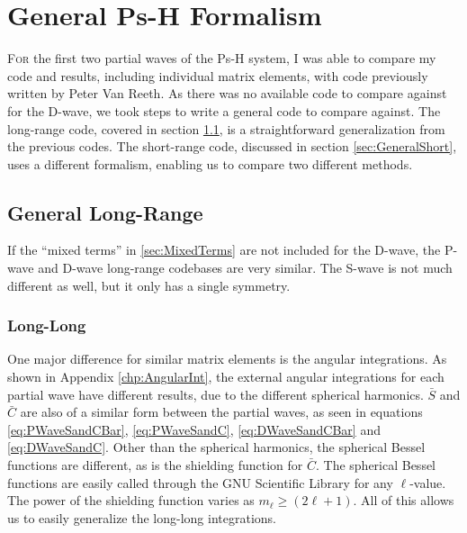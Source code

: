 \documentclass[Dissertation.tex]{subfiles}
\begin{document}
\clearpage
\pagebreak
\newpage

\chapter{General Ps-H Formalism}
\label{chp:General}


\lettrine{\textcolor{startcolor}{F}}{or} the first two partial waves of the Ps-H system, I was able to compare my code and results, including individual matrix elements, with code previously written by Peter Van Reeth. As there was no available code to compare against for the D-wave, we took steps to write a general code to compare against. The long-range code, covered in section \ref{sec:GeneralLong}, is a straightforward generalization from the previous codes. The short-range code, discussed in section \ref{sec:GeneralShort}, uses a different formalism, enabling us to compare two different methods.

\section{General Long-Range}
\label{sec:GeneralLong}

If the ``mixed terms'' in \cref{sec:MixedTerms} are not included for the D-wave, the P-wave and D-wave long-range codebases are very similar. The S-wave is not much different as well, but it only has a single symmetry.

\subsection{Long-Long}
\label{sec:GeneralLongLong}
One major difference for similar matrix elements is the angular integrations. As shown in Appendix \ref{chp:AngularInt}, the external angular integrations for each partial wave have different results, due to the different spherical harmonics. $\bar{S}$ and $\bar{C}$ are also of a similar form between the partial waves, as seen in equations \ref{eq:PWaveSandCBar}, \ref{eq:PWaveSandC}, \ref{eq:DWaveSandCBar} and \ref{eq:DWaveSandC}. Other than the spherical harmonics, the spherical Bessel functions are different, as is the shielding function for $\bar{C}$. The spherical Bessel functions are easily called through the GNU Scientific Library \cite{GSL} for any $\ell$-value. The power of the shielding function varies as $m_\ell \geq (2\ell + 1)$. All of this allows us to easily generalize the long-long integrations.
\end{document}

